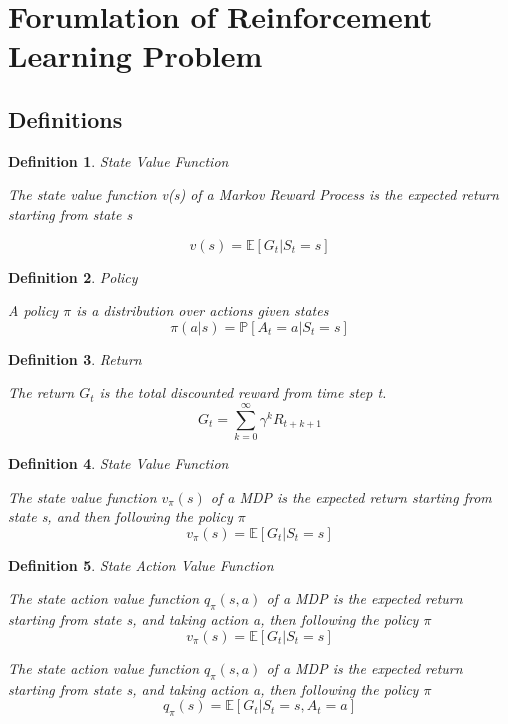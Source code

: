 \documentclass[12pt,a4paper]{article}
\newtheorem{definition}{Definition}
\begin{document}
\section{Forumlation of Reinforcement Learning Problem}

\subsection{Definitions}

\begin{definition}{State Value Function}

The state value function v(s) of a Markov Reward Process is the expected return starting from state s

\[ 
v(s) = \mathbb{E}[G_{t} \vert S_{t}=s]
\]
\end{definition}

\begin{definition}{Policy}

A policy $\pi$ is a distribution over actions given states
\[ 
\pi(a\vert s) = \mathbb{P}[A_{t}=a \vert S_{t}=s]
\]
\end{definition}

\begin{definition}{Return}

The return $G_{t}$ is the total discounted reward from time step t.
\[ 
G_{t} = \sum_{k=0}^{\infty}{\gamma^{k}R_{t+k+1}}
\]
\end{definition}

\begin{definition}{State Value Function}

The state value function $v_{\pi}(s)$ of a MDP is the expected return starting from state s, and then following the policy $\pi$
\[ 
v_{\pi}(s) = \mathbb{E}[G_{t} \vert S_{t}=s]
\]
\end{definition}

\begin{definition}{State Action Value Function}

The state action value function $q_{\pi}(s, a)$ of a MDP is the expected return starting from state s, and taking action a, then following the policy $\pi$
\[ 
v_{\pi}(s) = \mathbb{E}[G_{t} \vert S_{t}=s]
\]

The state action value function $q_{\pi}(s, a)$ of a MDP is the expected return starting from state s, and taking action a, then following the policy $\pi$
\[ 
q_{\pi}(s) = \mathbb{E}[G_{t} \vert S_{t}=s, A_{t}=a]
\]

\end{definition}
\end{document}
